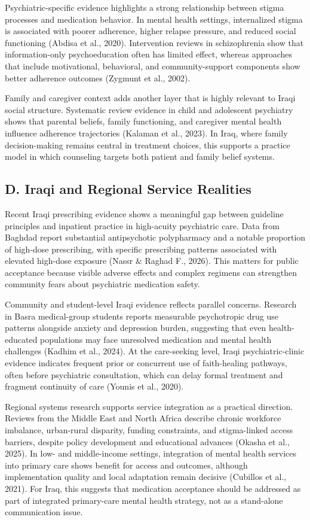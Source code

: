 Psychiatric-specific evidence highlights a strong relationship between
stigma processes and medication behavior. In mental health settings,
internalized stigma is associated with poorer adherence, higher relapse
pressure, and reduced social functioning (Abdisa et al., 2020).
Intervention reviews in schizophrenia show that information-only
psychoeducation often has limited effect, whereas approaches that
include motivational, behavioral, and community-support components show
better adherence outcomes (Zygmunt et al., 2002).

Family and caregiver context adds another layer that is highly relevant
to Iraqi social structure. Systematic review evidence in child and
adolescent psychiatry shows that parental beliefs, family functioning,
and caregiver mental health influence adherence trajectories (Kalaman et
al., 2023). In Iraq, where family decision-making remains central in
treatment choices, this supports a practice model in which counseling
targets both patient and family belief systems.

\subsection{D. Iraqi and Regional Service
Realities}\label{d.-iraqi-and-regional-service-realities}

Recent Iraqi prescribing evidence shows a meaningful gap between
guideline principles and inpatient practice in high-acuity psychiatric
care. Data from Baghdad report substantial antipsychotic polypharmacy
and a notable proportion of high-dose prescribing, with specific
prescribing patterns associated with elevated high-dose exposure (Nassr
\& Raghad F., 2026). This matters for public acceptance because visible
adverse effects and complex regimens can strengthen community fears
about psychiatric medication safety.

Community and student-level Iraqi evidence reflects parallel concerns.
Research in Basra medical-group students reports measurable psychotropic
drug use patterns alongside anxiety and depression burden, suggesting
that even health-educated populations may face unresolved medication and
mental health challenges (Kadhim et al., 2024). At the care-seeking
level, Iraqi psychiatric-clinic evidence indicates frequent prior or
concurrent use of faith-healing pathways, often before psychiatric
consultation, which can delay formal treatment and fragment continuity
of care (Younis et al., 2020).

Regional systems research supports service integration as a practical
direction. Reviews from the Middle East and North Africa describe
chronic workforce imbalance, urban-rural disparity, funding constraints,
and stigma-linked access barriers, despite policy development and
educational advances (Okasha et al., 2025). In low- and middle-income
settings, integration of mental health services into primary care shows
benefit for access and outcomes, although implementation quality and
local adaptation remain decisive (Cubillos et al., 2021). For Iraq, this
suggests that medication acceptance should be addressed as part of
integrated primary-care mental health strategy, not as a stand-alone
communication issue.

